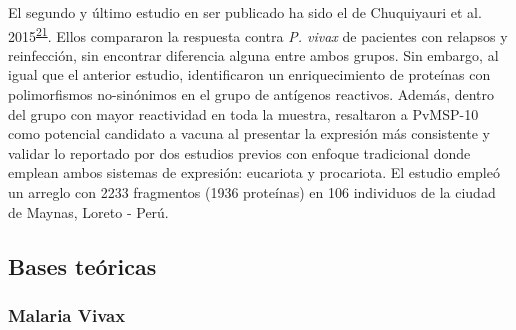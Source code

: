 \documentclass[]{article}
\begin{document}
\begin{enumerate}
  El segundo y último estudio en ser publicado ha sido el de Chuquiyauri
  et al.
  2015\textsuperscript{\protect\hyperlink{ref-chuquiyauri2015vivax}{21}}.
  Ellos compararon la respuesta contra \emph{P. vivax} de pacientes con
  relapsos y reinfección, sin encontrar diferencia alguna entre ambos
  grupos. Sin embargo, al igual que el anterior estudio, identificaron
  un enriquecimiento de proteínas con polimorfismos no-sinónimos en el
  grupo de antígenos reactivos. Además, dentro del grupo con mayor
  reactividad en toda la muestra, resaltaron a PvMSP-10 como potencial
  candidato a vacuna al presentar la expresión más consistente y validar
  lo reportado por dos estudios previos con enfoque tradicional donde
  emplean ambos sistemas de expresión: eucariota y procariota. El
  estudio empleó un arreglo con 2233 fragmentos (1936 proteínas) en 106
  individuos de la ciudad de Maynas, Loreto - Perú.
\end{enumerate}

\subsection{Bases teóricas}\label{bases-teoricas}

\subsubsection{Malaria Vivax}\label{malaria-vivax}
\end{document}
